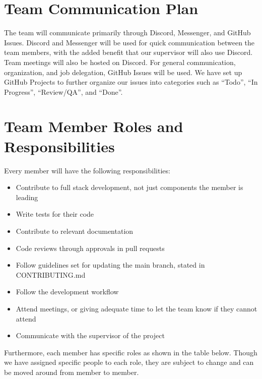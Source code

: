 \documentclass{article}
\begin{document}
\section{Team Communication Plan}

The team will communicate primarily through Discord, Messenger, and GitHub Issues. Discord 
and Messenger will be used for quick communication between the team members, with the added 
benefit that our supervisor will also use Discord. Team meetings will also be hosted on Discord. For 
general communication, organization, and job delegation, GitHub Issues will be used. We have set up 
GitHub Projects to further organize our issues into categories such as ``Todo'', ``In Progress'', 
``Review/QA'', and ``Done''.

\section{Team Member Roles and Responsibilities}

Every member will have the following responsibilities:

\begin{itemize}
	\item Contribute to full stack development, not just components the member is leading
	\item Write tests for their code
	\item Contribute to relevant documentation
	\item Code reviews through approvals in pull requests
	\item Follow guidelines set for updating the main branch, stated in CONTRIBUTING.md
	\item Follow the development workflow
	\item Attend meetings, or giving adequate time to let the team know if they cannot attend
	\item Communicate with the supervisor of the project
\end{itemize}

Furthermore, each member has specific roles as shown in the table below. Though we have assigned 
specific people to each role, they are subject to change and can be moved around from member to 
member.
\end{document}
